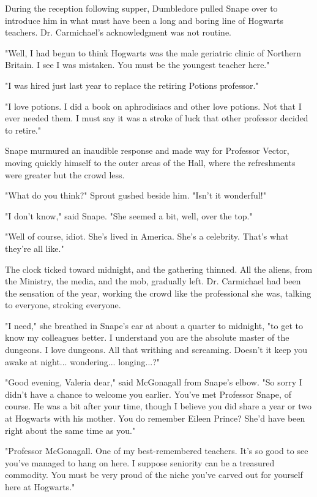 During the reception following supper, Dumbledore pulled Snape over to introduce him in what must have been a long and boring line of Hogwarts teachers. Dr. Carmichael's acknowledgment was not routine.

"Well, I had begun to think Hogwarts was the male geriatric clinic of Northern Britain. I see I was mistaken. You must be the youngest teacher here."

"I was hired just last year to replace the retiring Potions professor."

"I love potions. I did a book on aphrodisiacs and other love potions. Not that I ever needed them. I must say it was a stroke of luck that other professor decided to retire."

Snape murmured an inaudible response and made way for Professor Vector, moving quickly himself to the outer areas of the Hall, where the refreshments were greater but the crowd less.

"What do you think?" Sprout gushed beside him. "Isn't it wonderful!"

"I don't know," said Snape. "She seemed a bit, well, over the top."

"Well of course, idiot. She's lived in America. She's a celebrity. That's what they're all like."

The clock ticked toward midnight, and the gathering thinned. All the aliens, from the Ministry, the media, and the mob, gradually left. Dr. Carmichael had been the sensation of the year, working the crowd like the professional she was, talking to everyone, stroking everyone.

"I need," she breathed in Snape's ear at about a quarter to midnight, "to get to know my colleagues better. I understand you are the absolute master of the dungeons. I love dungeons. All that writhing and screaming. Doesn't it keep you awake at night... wondering... longing...?"

"Good evening, Valeria dear," said McGonagall from Snape's elbow. "So sorry I didn't have a chance to welcome you earlier. You've met Professor Snape, of course. He was a bit after your time, though I believe you did share a year or two at Hogwarts with his mother. You do remember Eileen Prince? She'd have been right about the same time as you."

"Professor McGonagall. One of my best-remembered teachers. It's so good to see you've managed to hang on here. I suppose seniority can be a treasured commodity. You must be very proud of the niche you've carved out for yourself here at Hogwarts."

